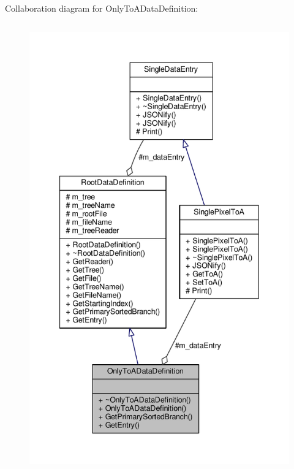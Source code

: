 Collaboration diagram for Only\+To\+A\+Data\+Definition\+:\nopagebreak
\begin{figure}[H]
\begin{center}
\leavevmode
\includegraphics[height=550pt]{classOnlyToADataDefinition__coll__graph}
\end{center}
\end{figure}
